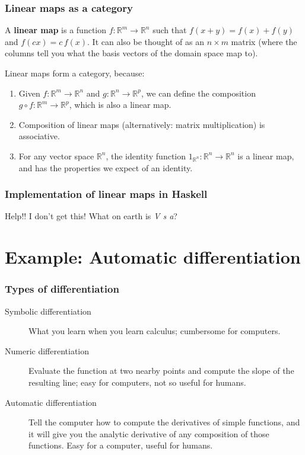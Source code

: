 \documentclass[10pt]{beamer}
\theoremstyle{definition}
\theoremstyle{remark}
\numberwithin{equation}{section}
\begin{document}
\begin{frame}[fragile]{}
  \frametitle{Linear maps as a category}

  A \textbf{linear map} is a function $f\colon \mathbb{R}^m \rightarrow \mathbb{R}^n$
  such that $f(x + y) = f(x) + f(y)$ and $f(cx) = c\,f(x)$.
  It can also be thought of as an $n \times m$ matrix (where the columns tell you
  what the basis vectors of the domain space map to).

  Linear maps form a category, because:
  \begin{enumerate}
  \item Given $f\colon \mathbb{R}^m \rightarrow \mathbb{R}^n$ and $g\colon \mathbb{R}^n \rightarrow
    \mathbb{R}^p$, we can define the composition $g \circ f \colon \mathbb{R}^m \rightarrow
    \mathbb{R}^p$, which is also a linear map.
  \item Composition of linear maps (alternatively: matrix multiplication) is
    associative.
  \item For any vector space $\mathbb{R}^n$, the identity function
    $1_{\mathbb{R}^n}\colon \mathbb{R}^n \rightarrow \mathbb{R}^n$ is a linear map, and
    has the properties we expect of an identity.
  \end{enumerate}
\end{frame}

\begin{frame}[fragile]
  \frametitle{Implementation of linear maps in Haskell}

  Help!! I don't get this! What on earth is \emph{V s a}?
\end{frame}

\section{Example: Automatic differentiation}

\begin{frame}[fragile]
  \frametitle{Types of differentiation}

  \begin{description}
  \item[Symbolic differentiation] What you learn when you learn calculus;
    cumbersome for computers.
  \item[Numeric differentiation] Evaluate the function at two nearby points and
    compute the slope of the resulting line; easy for computers, not so useful
    for humans.
  \item[Automatic differentiation] Tell the computer how to compute the
    derivatives of simple functions, and it will give you the analytic
    derivative of any composition of those functions. Easy for a computer,
    useful for humans.
  \end{description}
\end{frame}
\end{document}
